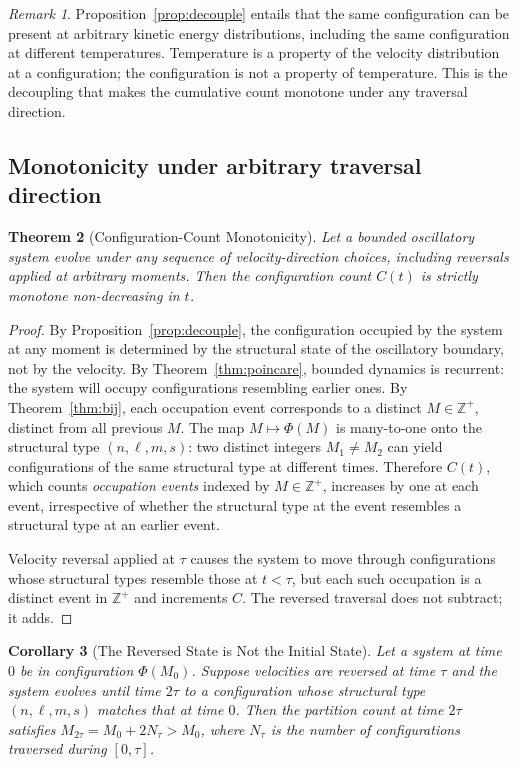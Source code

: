 \documentclass[twocolumn,10pt,a4paper]{article}
\theoremstyle{thmstyle}
\newtheorem{theorem}{Theorem}[section]
\newtheorem{corollary}[theorem]{Corollary}
\theoremstyle{definition}
\theoremstyle{remark}
\newtheorem{remark}[theorem]{Remark}
\newcommand{\Zp}{\mathbb{Z}^{+}}
\newcommand{\PhiMap}{\varPhi}
\begin{document}
\begin{remark}
\label{rem:tempindep}
Proposition~\ref{prop:decouple} entails that the same configuration
can be present at arbitrary kinetic energy distributions, including
the same configuration at different temperatures. Temperature is a
property of the velocity distribution at a configuration; the
configuration is not a property of temperature. This is the decoupling
that makes the cumulative count monotone under any traversal direction.
\end{remark}

\subsection{Monotonicity under arbitrary traversal direction}

\begin{theorem}[Configuration-Count Monotonicity]
\label{thm:mono}
Let a bounded oscillatory system evolve under any sequence of
velocity-direction choices, including reversals applied at arbitrary
moments. Then the configuration count $C(t)$ is strictly monotone
non-decreasing in $t$.
\end{theorem}

\begin{proof}
By Proposition~\ref{prop:decouple}, the configuration occupied by the
system at any moment is determined by the structural state of the
oscillatory boundary, not by the velocity. By
Theorem~\ref{thm:poincare}, bounded dynamics is recurrent: the system
will occupy configurations resembling earlier ones. By
Theorem~\ref{thm:bij}, each occupation event corresponds to a distinct
$M\in\Zp$, distinct from all previous $M$. The map
$M\mapsto\PhiMap(M)$ is many-to-one onto the structural type
$(n,\ell,m,s)$: two distinct integers $M_{1}\neq M_{2}$ can yield
configurations of the same structural type at different times.
Therefore $C(t)$, which counts \emph{occupation events} indexed by
$M\in\Zp$, increases by one at each event, irrespective of whether
the structural type at the event resembles a structural type at an
earlier event.

Velocity reversal applied at $\tau$ causes the system to move through
configurations whose structural types resemble those at $t<\tau$, but
each such occupation is a distinct event in $\Zp$ and increments
$C$. The reversed traversal does not subtract; it adds.
\end{proof}

\begin{corollary}[The Reversed State is Not the Initial State]
\label{cor:notinitial}
Let a system at time $0$ be in configuration $\PhiMap(M_{0})$. Suppose
velocities are reversed at time $\tau$ and the system evolves until
time $2\tau$ to a configuration whose structural type
$(n,\ell,m,s)$ matches that at time $0$. Then the partition count at
time $2\tau$ satisfies $M_{2\tau}=M_{0}+2N_{\tau}>M_{0}$, where
$N_{\tau}$ is the number of configurations traversed during $[0,\tau]$.
\end{corollary}
\end{document}
